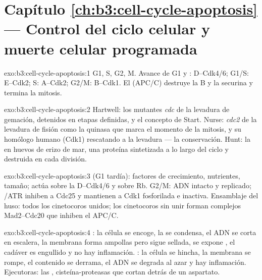 \section*{Capítulo \ref{ch:b3:cell-cycle-apoptosis} --- Control del ciclo celular y muerte celular programada}

\begin{solution}{exo:b3:cell-cycle-apoptosis:1}
G1, S, G2, M. Avance de G1 y :  D--Cdk4/6;
G1/S:  E--Cdk2; S:  A--Cdk2; G2/M:  B--Cdk1. El
 (APC/C) destruye la  B y la
securina y termina la mitosis.
\end{solution}

\begin{solution}{exo:b3:cell-cycle-apoptosis:2}
Hartwell: los mutantes \emph{cdc} de la levadura de gemación, detenidos
en etapas definidas, y el concepto de Start. Nurse: \emph{cdc2} de la
levadura de fisión como la quinasa que marca el momento de la mitosis, y
su homólogo humano (Cdk1) rescatando a la levadura --- la conservación.
Hunt: la  en huevos de erizo de mar, una proteína sintetizada a lo
largo del ciclo y destruida en cada división.
\end{solution}

\begin{solution}{exo:b3:cell-cycle-apoptosis:3}
 (G1 tardía): factores de crecimiento, nutrientes,
tamaño; actúa sobre la  D--Cdk4/6 y sobre Rb. G2/M: ADN intacto y
replicado; /ATR inhiben a Cdc25 y mantienen a Cdk1 fosforilada e
inactiva. Ensamblaje del huso: todos los cinetocoros unidos; los
cinetocoros sin unir forman complejos Mad2--Cdc20 que inhiben el APC/C.
\end{solution}

\begin{solution}{exo:b3:cell-cycle-apoptosis:4}
: la célula se encoge, la  se condensa, el ADN se corta
en escalera, la membrana forma ampollas pero sigue sellada, se expone
, el cadáver es engullido y no hay inflamación. :
la célula se hincha, la membrana se rompe, el contenido se derrama, el
ADN se degrada al azar y hay inflamación. Ejecutoras: las ,
cisteína-proteasas que cortan detrás de un aspartato.
\end{solution}

